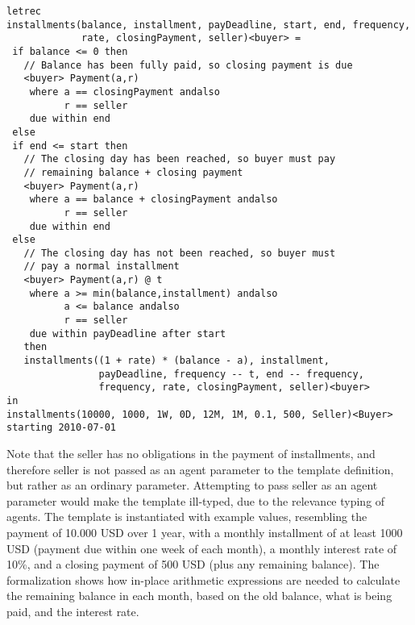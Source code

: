 \documentclass[orivec,final]{llncs-href}
\begin{document}
\begin{lstlisting}[language=csl]
letrec
installments(balance, installment, payDeadline, start, end, frequency,
             rate, closingPayment, seller)<buyer> =
 if balance <= 0 then
   // Balance has been fully paid, so closing payment is due
   <buyer> Payment(a,r)
    where a == closingPayment andalso
          r == seller
    due within end
 else
 if end <= start then
   // The closing day has been reached, so buyer must pay
   // remaining balance + closing payment
   <buyer> Payment(a,r)
    where a == balance + closingPayment andalso
          r == seller
    due within end
 else
   // The closing day has not been reached, so buyer must 
   // pay a normal installment
   <buyer> Payment(a,r) @ t
    where a >= min(balance,installment) andalso
          a <= balance andalso
          r == seller
    due within payDeadline after start
   then
   installments((1 + rate) * (balance - a), installment,
                payDeadline, frequency -- t, end -- frequency,
                frequency, rate, closingPayment, seller)<buyer>
in
installments(10000, 1000, 1W, 0D, 12M, 1M, 0.1, 500, Seller)<Buyer>
starting 2010-07-01
\end{lstlisting}
Note that the seller has no obligations in the payment of
installments, and therefore seller is not passed as an agent parameter
to the template definition, but rather as an ordinary
parameter. Attempting to pass seller as an agent parameter would make
the template ill-typed, due to the relevance typing of agents. The
template is instantiated with example values, resembling the payment
of 10.000 USD over 1 year, with a monthly installment of at least 1000
USD (payment due within one week of each month), a monthly interest
rate of 10\%, and a closing payment of 500 USD (plus any remaining
balance). The formalization shows how in-place arithmetic expressions
are needed to calculate the remaining balance in each month, based on
the old balance, what is being paid, and the interest rate.
\end{document}
